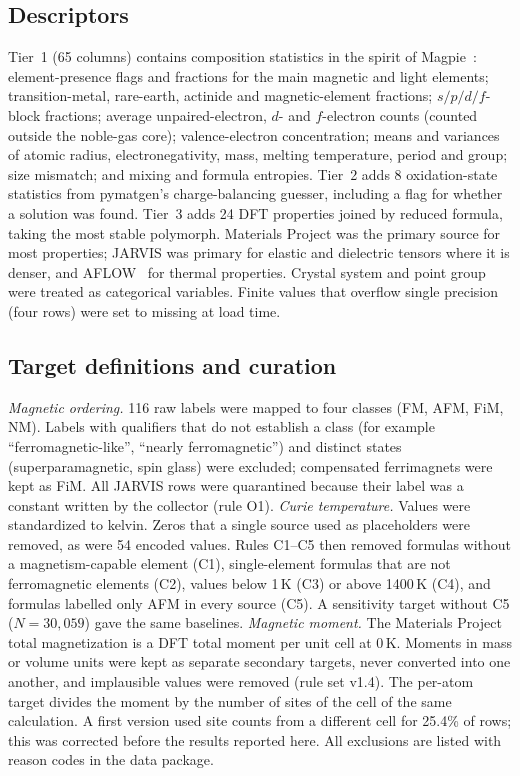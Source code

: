 \documentclass[pdflatex,sn-nature]{sn-jnl}
\begin{document}
\subsection{Descriptors}
Tier~1 (65 columns) contains composition statistics in the spirit of Magpie~\cite{ward2016magpie}: element-presence flags and fractions for the main magnetic and light elements; transition-metal, rare-earth, actinide and magnetic-element fractions; $s/p/d/f$-block fractions; average unpaired-electron, $d$- and $f$-electron counts (counted outside the noble-gas core); valence-electron concentration; means and variances of atomic radius, electronegativity, mass, melting temperature, period and group; size mismatch; and mixing and formula entropies. Tier~2 adds 8 oxidation-state statistics from pymatgen's charge-balancing guesser, including a flag for whether a solution was found. Tier~3 adds 24 DFT properties joined by reduced formula, taking the most stable polymorph. Materials Project was the primary source for most properties; JARVIS was primary for elastic and dielectric tensors where it is denser, and AFLOW~\cite{curtarolo2012aflow} for thermal properties. Crystal system and point group were treated as categorical variables. Finite values that overflow single precision (four rows) were set to missing at load time.

\subsection{Target definitions and curation}
\emph{Magnetic ordering.} 116 raw labels were mapped to four classes (FM, AFM, FiM, NM). Labels with qualifiers that do not establish a class (for example ``ferromagnetic-like'', ``nearly ferromagnetic'') and distinct states (superparamagnetic, spin glass) were excluded; compensated ferrimagnets were kept as FiM. All JARVIS rows were quarantined because their label was a constant written by the collector (rule O1). \emph{Curie temperature.} Values were standardized to kelvin. Zeros that a single source used as placeholders were removed, as were 54 encoded values. Rules C1--C5 then removed formulas without a magnetism-capable element (C1), single-element formulas that are not ferromagnetic elements (C2), values below 1\,K (C3) or above 1400\,K (C4), and formulas labelled only AFM in every source (C5). A sensitivity target without C5 ($N=30{,}059$) gave the same baselines. \emph{Magnetic moment.} The Materials Project total magnetization is a DFT total moment per unit cell at 0\,K. Moments in mass or volume units were kept as separate secondary targets, never converted into one another, and implausible values were removed (rule set v1.4). The per-atom target divides the moment by the number of sites of the cell of the same calculation. A first version used site counts from a different cell for 25.4\% of rows; this was corrected before the results reported here. All exclusions are listed with reason codes in the data package.
\end{document}
